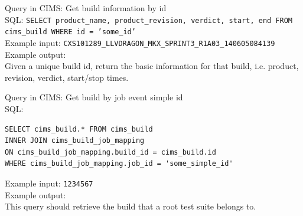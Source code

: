 \label{q:getbuildinfo}
Query in CIMS: Get build information by id \\
SQL: {\tt SELECT product\_name, product\_revision, verdict, start, end FROM cims\_build WHERE id = 'some\_id'} \\
Example input: {\tt CXS101289\_LLVDRAGON\_MKX\_SPRINT3\_R1A03\_140605084139 }  \\
Example output: \\
Given a unique build id, return the basic information for that build, i.e. product, revision, verdict, start/stop times.

\label{q:getbuildforroot}
Query in CIMS: Get build by job event simple id \\
SQL: 
\begin{verbatim}
SELECT cims_build.* FROM cims_build
INNER JOIN cims_build_job_mapping
ON cims_build_job_mapping.build_id = cims_build.id   
WHERE cims_build_job_mapping.job_id = 'some_simple_id'
\end{verbatim} 
Example input: {\tt 1234567 }  \\
Example output: \\
This query should retrieve the build that a root test suite belongs to.




